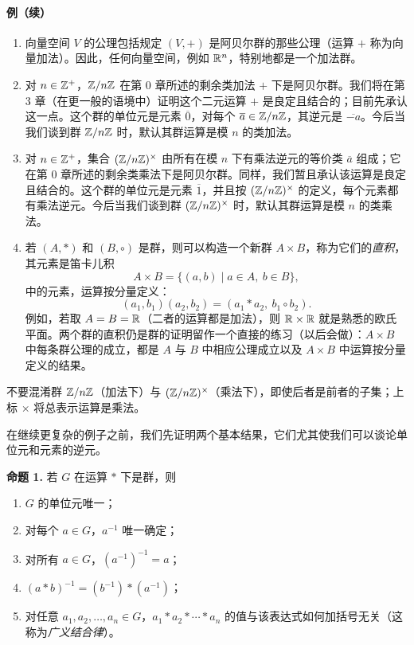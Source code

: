 \paragraph{例（续）}
\begin{enumerate}[label=(\arabic*),start=3]
  \item 向量空间 $V$ 的公理包括规定 $(V,+)$ 是阿贝尔群的那些公理（运算 $+$ 称为向量加法）。因此，任何向量空间，例如 $\mathbb{R}^n$，特别地都是一个加法群。
  \item 对 $n\in\mathbb{Z}^+$，$\mathbb{Z}/n\mathbb{Z}$ 在第 0 章所述的剩余类加法 $+$ 下是阿贝尔群。我们将在第 3 章（在更一般的语境中）证明这个二元运算 $+$ 是良定且结合的；目前先承认这一点。这个群的单位元是元素 $\overline{0}$，对每个 $\overline{a}\in\mathbb{Z}/n\mathbb{Z}$，其逆元是 $\overline{-a}$。今后当我们谈到群 $\mathbb{Z}/n\mathbb{Z}$ 时，默认其群运算是模 $n$ 的类加法。
  \item 对 $n\in\mathbb{Z}^+$，集合 $(\mathbb{Z}/n\mathbb{Z})^\times$ 由所有在模 $n$ 下有乘法逆元的等价类 $\overline{a}$ 组成；它在第 0 章所述的剩余类乘法下是阿贝尔群。同样，我们暂且承认该运算是良定且结合的。这个群的单位元是元素 $\overline{1}$，并且按 $(\mathbb{Z}/n\mathbb{Z})^\times$ 的定义，每个元素都有乘法逆元。今后当我们谈到群 $(\mathbb{Z}/n\mathbb{Z})^\times$ 时，默认其群运算是模 $n$ 的类乘法。
  \item 若 $(A,*)$ 和 $(B,\circ)$ 是群，则可以构造一个新群 $A\times B$，称为它们的\emph{直积}，其元素是笛卡儿积
  \[
    A\times B=\{(a,b)\mid a\in A,\ b\in B\},
  \]
  中的元素，运算按分量定义：
  \[
    (a_1,b_1)(a_2,b_2)=(a_1*a_2,\ b_1\circ b_2).
  \]
  例如，若取 $A=B=\mathbb{R}$（二者的运算都是加法），则 $\mathbb{R}\times\mathbb{R}$ 就是熟悉的欧氏平面。两个群的直积仍是群的证明留作一个直接的练习（以后会做）：$A\times B$ 中每条群公理的成立，都是 $A$ 与 $B$ 中相应公理成立以及 $A\times B$ 中运算按分量定义的结果。
\end{enumerate}

不要混淆群 $\mathbb{Z}/n\mathbb{Z}$（加法下）与 $(\mathbb{Z}/n\mathbb{Z})^\times$（乘法下），即使后者是前者的子集；上标 $\times$ 将总表示运算是乘法。

在继续更复杂的例子之前，我们先证明两个基本结果，它们尤其使我们可以谈论单位元和元素的逆元。

\medskip
\noindent\textbf{命题 1.} 若 $G$ 在运算 $*$ 下是群，则
\begin{enumerate}[label=(\arabic*)]
  \item $G$ 的单位元唯一；
  \item 对每个 $a\in G$，$a^{-1}$ 唯一确定；
  \item 对所有 $a\in G$，$(a^{-1})^{-1}=a$；
  \item $(a*b)^{-1}=(b^{-1})*(a^{-1})$；
  \item 对任意 $a_1,a_2,\ldots,a_n\in G$，$a_1*a_2*\cdots*a_n$ 的值与该表达式如何加括号无关（这称为\emph{广义结合律}）。
\end{enumerate}

